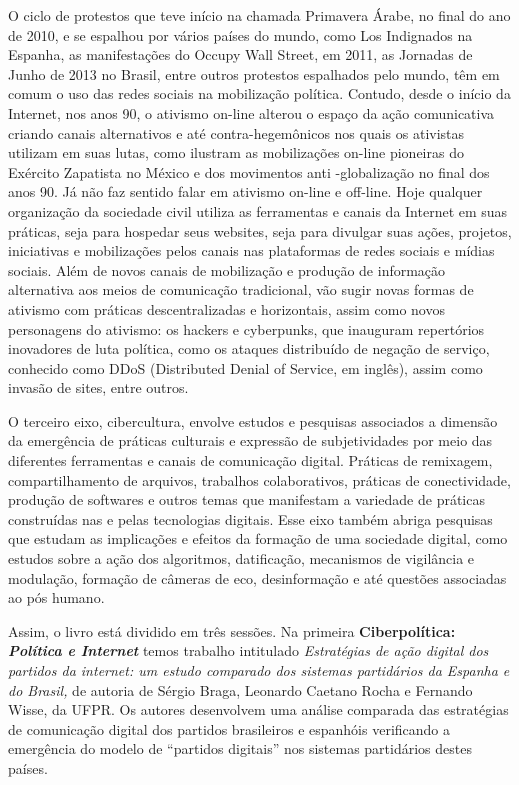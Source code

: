 O ciclo de protestos que teve início na chamada Primavera Árabe, no
final do ano de 2010, e se espalhou por vários países do mundo, como Los
Indignados na Espanha, as manifestações do Occupy Wall Street, em 2011,
as Jornadas de Junho de 2013 no Brasil, entre outros protestos
espalhados pelo mundo, têm em comum o uso das redes sociais na
mobilização política. Contudo, desde o início da Internet, nos anos 90,
o ativismo on-line alterou o espaço da ação comunicativa criando canais
alternativos e até contra-hegemônicos nos quais os ativistas utilizam em
suas lutas, como ilustram as mobilizações on-line pioneiras do Exército
Zapatista no México e dos movimentos anti -globalização no final dos
anos 90. Já não faz sentido falar em ativismo on-line e off-line. Hoje
qualquer organização da sociedade civil utiliza as ferramentas e canais
da Internet em suas práticas, seja para hospedar seus websites, seja
para divulgar suas ações, projetos, iniciativas e mobilizações pelos
canais nas plataformas de redes sociais e mídias sociais. Além de novos
canais de mobilização e produção de informação alternativa aos meios de
comunicação tradicional, vão sugir novas formas de ativismo com práticas
descentralizadas e horizontais, assim como novos personagens do
ativismo: os hackers e cyberpunks, que inauguram repertórios inovadores
de luta política, como os ataques distribuído de negação de serviço,
conhecido como DDoS (Distributed Denial of Service, em inglês), assim
como invasão de sites, entre outros.

O terceiro eixo, cibercultura, envolve estudos e pesquisas associados a
dimensão da emergência de práticas culturais e expressão de
subjetividades por meio das diferentes ferramentas e canais de
comunicação digital. Práticas de remixagem, compartilhamento de
arquivos, trabalhos colaborativos, práticas de conectividade, produção
de softwares e outros temas que manifestam a variedade de práticas
construídas nas e pelas tecnologias digitais. Esse eixo também abriga
pesquisas que estudam as implicações e efeitos da formação de uma
sociedade digital, como estudos sobre a ação dos algoritmos,
datificação, mecanismos de vigilância e modulação, formação de câmeras
de eco, desinformação e até questões associadas ao pós humano.

Assim, o livro está dividido em três sessões. Na primeira
\textbf{Ciberpolítica: \emph{Política e Internet }}temos trabalho
intitulado \emph{Estratégias de ação digital dos partidos da internet:
um estudo comparado dos sistemas partidários da Espanha e do Brasil,} de
autoria de Sérgio Braga, Leonardo Caetano Rocha e Fernando Wisse, da
UFPR. Os autores desenvolvem uma análise comparada das estratégias de
comunicação digital dos partidos brasileiros e espanhóis verificando a
emergência do modelo de ``partidos digitais'' nos sistemas partidários
destes países.

